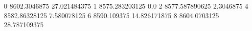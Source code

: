 0 8602.3046875 27.021484375
1 8575.283203125 0.0
2 8577.587890625 2.3046875
4 8582.86328125 7.580078125
6 8590.109375 14.826171875
8 8604.0703125 28.787109375
